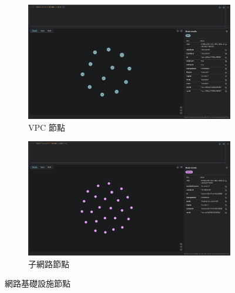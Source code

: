 \documentclass[11pt,a4paper]{ctexart}
\begin{document}
\begin{figure}[H]
\centering
\begin{subfigure}[b]{0.48\textwidth}
\centering
\includegraphics[width=\textwidth]{VPC.png}
\caption{VPC 節點}
\label{fig:vpc_nodes}
\end{subfigure}
\hfill
\begin{subfigure}[b]{0.48\textwidth}
\centering
\includegraphics[width=\textwidth]{Subnet.png}
\caption{子網路節點}
\label{fig:subnet_nodes}
\end{subfigure}
\caption{網路基礎設施節點}
\label{fig:network_nodes}
\end{figure}
\end{document}
